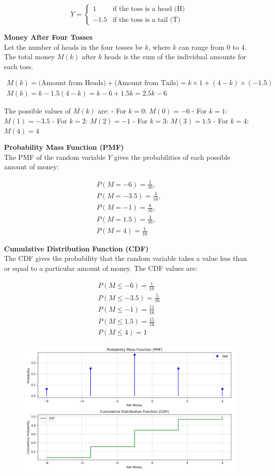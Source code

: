 \documentclass[journal]{IEEEtran}
\numberwithin{equation}{enumi}
\numberwithin{figure}{enumi}
\begin{document}
\[
Y = 
\begin{cases} 
1 & \text{if the toss is a head (H)} \\
-1.5 & \text{if the toss is a tail (T)}
\end{cases}
\]

\textbf{Money After Four Tosses}\\
Let the number of heads in the four tosses be $ k $, where $ k $ can range from 0 to 4. The total money $ M(k) $ after $k $ heads is the sum of the individual amounts for each toss.

\begin{align}
M(k) = \text{(Amount from Heads)} + \text{(Amount from Tails)} = k \times 1 + (4 - k) \times (-1.5)\\
M(k) = k - 1.5(4 - k) = k - 6 + 1.5k = 2.5k - 6
\end{align}

The possible values of $ M(k) $ are:
- For $ k = 0 $: $ M(0) = -6 $
- For $ k = 1 $: $ M(1) = -3.5 $
- For $ k = 2 $: $ M(2) = -1 $
- For $ k = 3 $: $ M(3) = 1.5 $
- For $ k = 4 $: $ M(4) = 4 $

\textbf{Probability Mass Function (PMF)}\\
The PMF of the random variable \( Y \) gives the probabilities of each possible amount of money:

\begin{align}
P(M = -6) = \frac{1}{16},\\ P(M = -3.5) = \frac{4}{16},\\ P(M = -1) = \frac{6}{16}, \\ P(M = 1.5) = \frac{4}{16}, \\ P(M = 4) = \frac{1}{16}
\end{align}

\textbf{Cumulative Distribution Function (CDF)}\\
The CDF gives the probability that the random variable takes a value less than or equal to a particular amount of money. The CDF values are:

\begin{align}
P(M \leq -6) = \frac{1}{16}\\
P(M \leq -3.5) = \frac{5}{16}\\
P(M \leq -1) = \frac{11}{16}\\
P(M \leq 1.5) = \frac{15}{16}\\
P(M \leq 4) = 1
\end{align}


\begin{figure}[h!]
   \centering
   \includegraphics[width=0.7\linewidth]{figs/Figure_1.png}
\end{figure}
\end{document}

